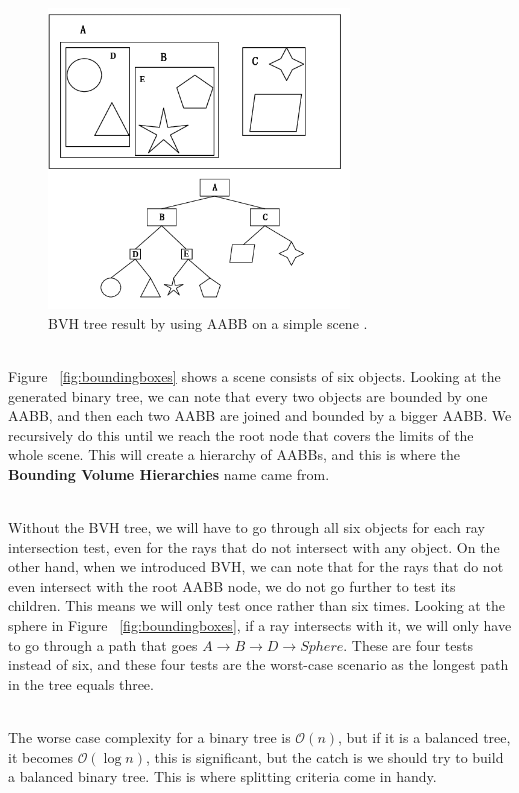 \documentclass[11pt,a4paper]{article}
\begin{document}
\begin{figure}[h]	
     \centering
     \captionsetup{justification=centering,margin=2cm}
     \includegraphics[width=8cm]{images/bvh_tree.png}
     \caption{BVH tree result by using AABB on a simple scene
. \protect\cite{Ericson2004} }
        \label{fig:boundingvolume}
\end{figure}

\noindent
\\
Figure ~\ref{fig:boundingboxes} shows a scene consists of six objects. Looking at the generated binary tree, we can note that every two objects are bounded by one AABB, and then each two AABB are joined and bounded by a bigger AABB. We recursively do this until we reach the root node that covers the limits of the whole scene. This will create a hierarchy of AABBs, and this is where the \textbf{Bounding Volume Hierarchies} name came from.

\noindent
\\
Without the BVH tree, we will have to go through all six objects for each ray intersection test, even for the rays that do not intersect with any object. On the other hand, when we introduced BVH, we can note that for the rays that do not even intersect with the root AABB node, we do not go further to test its children. This means we will only test once rather than six times. Looking at the sphere in Figure ~\ref{fig:boundingboxes}, if a ray intersects with it, we will only have to go through a path that goes $A \rightarrow B \rightarrow D \rightarrow Sphere$. These are four tests instead of six, and these four tests are the worst-case scenario as the longest path in the tree equals three. 

\noindent
\\
The worse case complexity for a binary tree is $\mathcal{O}(n)$, but if it is a balanced tree, it becomes $\mathcal{O}(\log{}n)$, this is significant, but the catch is we should try to build a balanced binary tree. This is where splitting criteria come in handy. 
\end{document}
